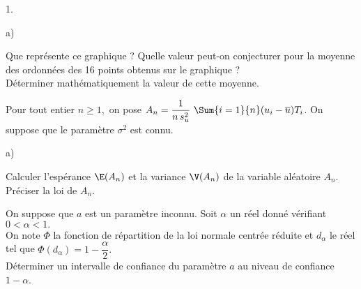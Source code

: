 \documentclass[11pt]{article}%
\begin{document}
\begin{noliste}{1.}
\begin{noliste}{a)}
\begin{center}
{}
\end{center}

 Que représente ce graphique ?
 Quelle valeur peut-on conjecturer pour 
 la moyenne des ordonnées des 16 points obtenus sur le graphique ?\\
 Déterminer mathématiquement la valeur de cette moyenne.
 
 
 \end{noliste}
 
 \item Pour tout entier $n \geq 1,$ on pose 
 $A_n=\dfrac{1}{n \, s_u^2} \ \Sum{i=1}{n} (u_i-\overline{u})T_i$. On 
 suppose que le paramètre $\sigma^2$ est connu.
 \begin{noliste}{a)}
  \item Calculer l'espérance $\E(A_n)$ et la variance $\V(A_n)$ de la 
  variable aléatoire $A_n$. \\
  Préciser la loi de $A_n$.
  
  

  
  \item On suppose que $a$ est un paramètre inconnu. Soit $\alpha$ un 
  réel donné vérifiant $0 < \alpha < 1.$\\
  On note $\Phi$ la fonction de répartition de la loi normale centrée 
  réduite et $d_\alpha$ le réel tel que $\Phi(d_\alpha) = 
  1-\dfrac{\alpha}{2}.$\\
  Déterminer un intervalle de confiance du paramètre $a$ au niveau de 
  confiance $1-\alpha$.
  
  
 \end{noliste}
\end{noliste}
\end{document}
